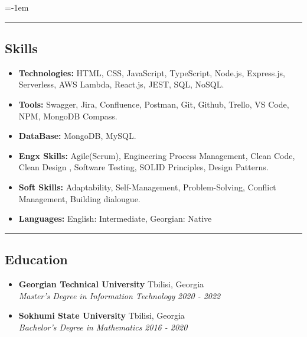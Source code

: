 \documentclass[10pt,letterpaper]{article}
\begin{document}
  
  
  
  \begin{itemize}
    \parskip=-1em
      \vspace{0.05em}

  \end{itemize}
   
\hrule
\vspace{-1.0em}
\subsection*{Skills}
\begin{itemize}
  \parskip=-0.5em
  
  \vspace{0.5em}
  \item[] \textbf{Technologies:} HTML, CSS, JavaScript, TypeScript, Node.js, Express.js, Serverless, AWS Lambda, React.js, JEST, SQL, NoSQL.
  \vspace{0.5em}
  \item[] \textbf{Tools:} Swagger, Jira, Confluence,	Postman, Git, Github, Trello, VS Code, NPM, MongoDB Compass.
  \vspace{0.5em}
  \item[] \textbf{DataBase:} MongoDB, MySQL.
  \vspace{0.5em}
  \item[] \textbf{Engx Skills:} Agile(Scrum), Engineering Process Management, Clean Code, Clean Design , Software Testing,  SOLID Principles, Design Patterns.
    \item[] \textbf{Soft Skills:} Adaptability, Self-Management, Problem-Solving, Conflict Management, Building dialougue.
  \vspace{0.5em}
  \vspace{0.05em}
  
  \item[] \textbf{Languages:} English: Intermediate, Georgian: Native
\end{itemize}

\hrule
\vspace{-1.0em}
\subsection*{Education}
 \begin{itemize}
    \parskip=-1em
      \vspace{0.05em}

    \item[]
    {\textbf{Georgian Technical University}}
     \hfill
     {Tbilisi, Georgia}
    \\
    {\emph{Master’s Degree in Information Technology}
     \hfill
     \emph{2020 - 2022}}
  \end{itemize}
  \begin{itemize}
    \parskip=-1em
      \vspace{0.05em}

    \item[]
    {\textbf{Sokhumi State University}}
     \hfill
    {Tbilisi, Georgia}
    \\
    {\emph{Bachelor’s Degree in Mathematics}
     \hfill
     \emph{2016 - 2020}}
  \end{itemize}
   
\end{document}
